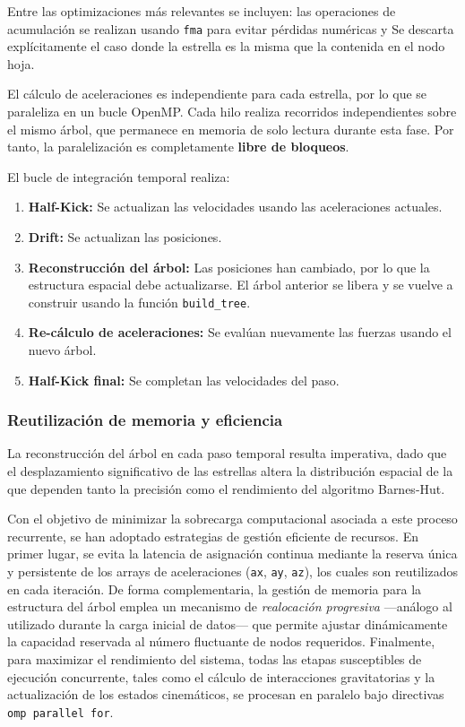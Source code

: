 Entre las optimizaciones más relevantes se incluyen: las operaciones de acumulación se realizan usando \texttt{fma} para evitar pérdidas numéricas y Se descarta explícitamente el caso donde la estrella es la misma que la contenida en el nodo hoja.

El cálculo de aceleraciones es independiente para cada estrella, por lo que se paraleliza en un bucle OpenMP.
Cada hilo realiza recorridos independientes sobre el mismo árbol, que permanece en memoria de solo lectura durante esta fase.
Por tanto, la paralelización es completamente \textbf{libre de bloqueos}.

El bucle de integración temporal realiza:
\begin{enumerate}
    \item \textbf{Half-Kick:} Se actualizan las velocidades usando las aceleraciones actuales.
    \item \textbf{Drift:} Se actualizan las posiciones.
    \item \textbf{Reconstrucción del árbol:} Las posiciones han cambiado, por lo que la estructura espacial debe actualizarse.
    El árbol anterior se libera y se vuelve a construir usando la función \texttt{build\_tree}.
    \item \textbf{Re-cálculo de aceleraciones:} Se evalúan nuevamente las fuerzas usando el nuevo árbol.
    \item \textbf{Half-Kick final:} Se completan las velocidades del paso.
\end{enumerate}

\subsubsection{Reutilización de memoria y eficiencia}
La reconstrucción del árbol en cada paso temporal resulta imperativa, dado que el desplazamiento significativo de las estrellas altera la distribución espacial de la que dependen tanto la precisión como el rendimiento del algoritmo Barnes-Hut.

Con el objetivo de minimizar la sobrecarga computacional asociada a este proceso recurrente, se han adoptado estrategias de gestión eficiente de recursos.
En primer lugar, se evita la latencia de asignación continua mediante la reserva única y persistente de los arrays de aceleraciones (\texttt{ax}, \texttt{ay}, \texttt{az}), los cuales son reutilizados en cada iteración.
De forma complementaria, la gestión de memoria para la estructura del árbol emplea un mecanismo de \textit{realocación progresiva} —análogo al utilizado durante la carga inicial de datos— que permite ajustar dinámicamente la capacidad reservada al número fluctuante de nodos requeridos.
Finalmente, para maximizar el rendimiento del sistema, todas las etapas susceptibles de ejecución concurrente, tales como el cálculo de interacciones gravitatorias y la actualización de los estados cinemáticos, se procesan en paralelo bajo directivas \texttt{omp parallel for}.

